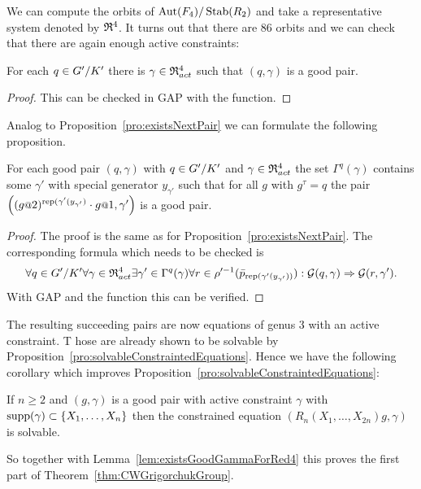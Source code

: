 \documentclass[a4paper,11pt]{amsart}
\begin{document}
We can compute the orbits of ${\operatorname{{Aut}}(F_4)/\operatorname{Stab}(R_2)}$ and take a representative system denoted by $\mathfrak{R}^4$.
It turns out that there are $86$ orbits and we can check that there are again enough active constraints:
\begin{lem} \label{lem:existsGoodGammaForRed4}
 For each $q\in{G'/K'}$ there is $\gamma\in \mathfrak{R}^4_{act}$ such that $(q,\gamma)$ is a 
 good pair.
\end{lem}
\begin{proof}
 This can be checked in GAP with the function\newline {}.
\end{proof}

Analog to Proposition~\ref{pro:existsNextPair} we can formulate the following proposition.
\begin{pro}\label{pro:existsNextPair4}
 For each good pair $(q,\gamma)$ with $q\in{G'/K'}$ and $\gamma\in\mathfrak{R}^4_{act}$ the set $\Gamma^q(\gamma)$ 
 contains some $\gamma'$ with special generator $y_{\gamma'}$ such that for all $g$ with $g^\tau=q$ the
 pair $\left((g\at{2})^{\textup{rep}(\gamma'(y_{\gamma'})}\cdot g\at{1},\gamma'\right)$ is a good pair.
\end{pro}
\begin{proof}
The proof is the same as for Proposition~\ref{pro:existsNextPair}. The corresponding formula which needs to be checked is 
\[\forall q\in{G'/K'}
      \forall \gamma\in\mathfrak{R}^4_{act} 
	 \exists \gamma'\in \Gamma^q(\gamma)
	    \forall r\in \rho'^{-1}(\bar p_{\textup{rep}(\gamma'(y_{\gamma'}))}):
	      \mathcal{G}(q,\gamma) \Rightarrow \mathcal{G}(r,\gamma').\]
 With GAP and the function  this can be verified. 
\end{proof}
The resulting succeeding pairs are now equations of genus $3$ with an active constraint. T
hose are already shown to be solvable 
by Proposition~\ref{pro:solvableConstraintedEquations}. Hence we have the following
corollary which improves Proposition~\ref{pro:solvableConstraintedEquations}:
\begin{cor}\label{cor:solvableConstraintedEquations}
If $n\geq2$ and $(g,\gamma)$ is a good pair with active constraint $\gamma$ with $\operatorname{{supp}}(\gamma)\subset\{X_1,\ldots,X_{n}\}$
 then the constrained equation $(R_n(X_1,\ldots,X_{2n})g,\gamma)$ is solvable. 
\end{cor}
So together with Lemma~\ref{lem:existsGoodGammaForRed4} this proves the first part of Theorem~\ref{thm:CWGrigorchukGroup}.
\end{document}
